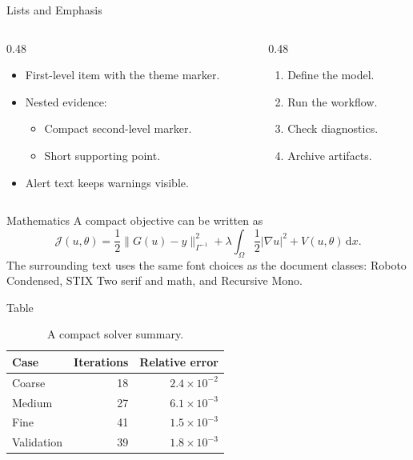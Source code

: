 \documentclass[aspectratio=1610]{beamer}
\begin{document}
\begin{frame}{Lists and Emphasis}
  \begin{columns}[T,totalwidth=\textwidth]
    \begin{column}{0.48\textwidth}
      \begin{itemize}
        \item First-level item with the theme marker.
        \item Nested evidence:
          \begin{itemize}
            \item Compact second-level marker.
            \item Short supporting point.
          \end{itemize}
        \item \alert{Alert text} keeps warnings visible.
      \end{itemize}
    \end{column}
    \begin{column}{0.48\textwidth}
      \begin{enumerate}
        \item Define the model.
        \item Run the workflow.
        \item Check diagnostics.
        \item Archive artifacts.
      \end{enumerate}
    \end{column}
  \end{columns}
\end{frame}


\begin{frame}{Mathematics}
  A compact objective can be written as
  \begin{equation*}
    \mathcal{J}(u,\theta)
    =
    \frac{1}{2}\lVert G(u)-y\rVert_{\Gamma^{-1}}^2
    + \lambda \int_\Omega
      \frac{1}{2}\lvert\nabla u\rvert^2 + V(u,\theta)\,\mathrm{d}x .
  \end{equation*}
  The surrounding text uses the same font choices as the document classes:
  Roboto Condensed, STIX Two serif and math, and Recursive Mono.
\end{frame}

\begin{frame}{Table}
  \begin{table}
    \centering
    \caption{A compact solver summary.}
    \begin{tabular}{lrr}
      \hline
      Case & Iterations & Relative error \\
      \hline
      Coarse & 18 & \(2.4\times10^{-2}\) \\
      Medium & 27 & \(6.1\times10^{-3}\) \\
      Fine & 41 & \(1.5\times10^{-3}\) \\
      Validation & 39 & \(1.8\times10^{-3}\) \\
      \hline
    \end{tabular}
  \end{table}
\end{frame}
\end{document}
